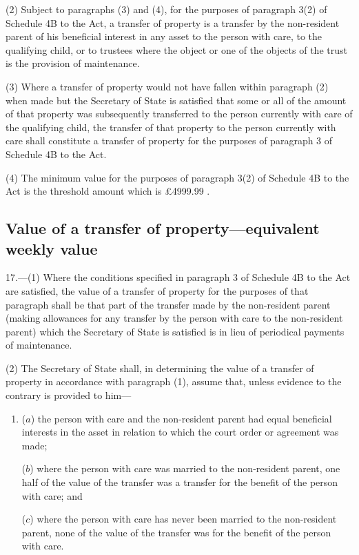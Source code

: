 \documentclass[12pt,a4paper]{article}
\begin{document}
(2) Subject to paragraphs (3) and (4), for the purposes of paragraph 3(2) of Schedule 4B to the Act, a transfer of property is a transfer by the non-resident parent of his beneficial interest in any asset to the person with care, to the qualifying child, or to trustees where the object or one of the objects of the trust is the provision of maintenance.

(3) Where a transfer of property would not have fallen within paragraph (2) when made but the Secretary of State is satisfied that some or all of the amount of that property was subsequently transferred to the person currently with care of the qualifying child, the transfer of that property to the person currently with care shall constitute a transfer of property for the purposes of paragraph 3 of Schedule 4B to the Act.

(4) The minimum value for the purposes of paragraph 3(2) of Schedule 4B to the Act is the threshold amount which is 
£4999$.$99%
.


\subsection[17. Value of a transfer of property—equivalent weekly value]{Value of a transfer of property—equivalent weekly value}

17.---(1)  Where the conditions specified in paragraph 3 of Schedule 4B to the Act are satisfied, the value of a transfer of property for the purposes of that paragraph shall be that part of the transfer made by the non-resident parent (making allowances for any transfer by the person with care to the non-resident parent) which the Secretary of State is satisfied is in lieu of periodical payments of maintenance.

(2) The Secretary of State shall, in determining the value of a transfer of property in accordance with paragraph (1), assume that, unless evidence to the contrary is provided to him—
\begin{enumerate}\item[]
($a$) the person with care and the non-resident parent had equal beneficial interests in the asset in relation to which the court order or agreement was made;

($b$) where the person with care was married to the non-resident parent, one half of the value of the transfer was a transfer for the benefit of the person with care; and

($c$) where the person with care has never been married to the non-resident parent, none of the value of the transfer was for the benefit of the person with care.
\end{enumerate}
\end{document}
